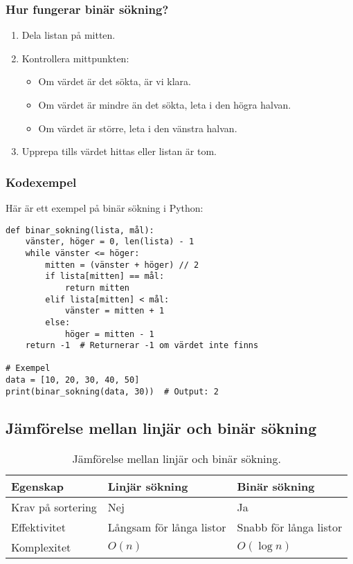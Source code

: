 \subsubsection*{Hur fungerar binär sökning?}
\begin{enumerate}
    \item Dela listan på mitten.
    \item Kontrollera mittpunkten:
        \begin{itemize}
            \item Om värdet är det sökta, är vi klara.
            \item Om värdet är mindre än det sökta, leta i den högra halvan.
            \item Om värdet är större, leta i den vänstra halvan.
        \end{itemize}
    \item Upprepa tills värdet hittas eller listan är tom.
\end{enumerate}

\subsubsection*{Kodexempel}
Här är ett exempel på binär sökning i Python:
\begin{lstlisting}[title=Binär sökning]
def binar_sokning(lista, mål):
    vänster, höger = 0, len(lista) - 1
    while vänster <= höger:
        mitten = (vänster + höger) // 2
        if lista[mitten] == mål:
            return mitten
        elif lista[mitten] < mål:
            vänster = mitten + 1
        else:
            höger = mitten - 1
    return -1  # Returnerar -1 om värdet inte finns

# Exempel
data = [10, 20, 30, 40, 50]
print(binar_sokning(data, 30))  # Output: 2
\end{lstlisting}

\subsection{Jämförelse mellan linjär och binär sökning}
\begin{table}[h!]
\centering
\begin{tabular}{|l|l|l|}
\hline
\textbf{Egenskap} & \textbf{Linjär sökning} & \textbf{Binär sökning} \\ \hline
Krav på sortering  & Nej                      & Ja                     \\ \hline
Effektivitet       & Långsam för långa listor & Snabb för långa listor \\ \hline
Komplexitet        & \(O(n)\)                & \(O(\log n)\)          \\ \hline
\end{tabular}
\caption{Jämförelse mellan linjär och binär sökning.}
\end{table}

